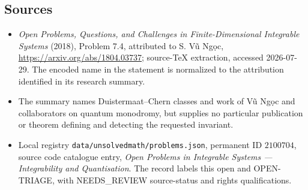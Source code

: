 \documentclass[11pt]{article}
\begin{document}
\subsection{Sources}
\begin{itemize}
\item \emph{Open Problems, Questions, and Challenges in Finite-Dimensional Integrable Systems} (2018), Problem 7.4, attributed to S. Vũ Ngọc, \url{https://arxiv.org/abs/1804.03737}; source-TeX extraction, accessed 2026-07-29. The encoded name in the statement is normalized to the attribution identified in its research summary.
\item The summary names Duistermaat--Chern classes and work of Vũ Ngọc and collaborators on quantum monodromy, but supplies no particular publication or theorem defining and detecting the requested invariant.
\item Local registry \texttt{data/unsolvedmath/problems.json}, permanent ID $2100704$, source code catalogue entry, \emph{Open Problems in Integrable Systems --- Integrability and Quantisation}. The record labels this open and OPEN-TRIAGE, with NEEDS\_REVIEW source-status and rights qualifications.
\end{itemize}
\end{document}
